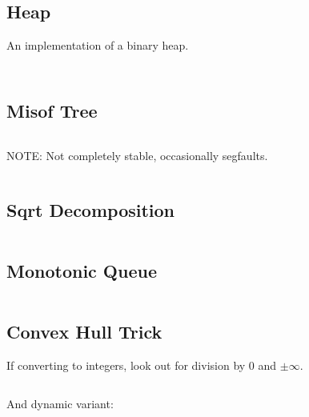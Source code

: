 \documentclass[8pt,a4paper,landscape,oneside]{amsart}
\newcommand{\code}[1]{\inputminted[fontsize=\normalsize,baselinestretch=1]{cpp}{_code/#1}}
\newif\ifverbose
\begin{document}
\begin{multicols*}{3}
    \subsection{Heap}
        An implementation of a binary heap.
        \code{data-structures/heap.cpp}
    \fi

    \ifverbose
    \subsection{Dancing Links}
        \ifverbose
        An implementation of Donald Knuth's Dancing Links data structure. A
        linked list supporting deletion and restoration of elements.
        \fi
        \code{data-structures/dancing_links.cpp}
    \fi

    \subsection{Misof Tree}
        \ifverbose
        A simple tree data structure for inserting, erasing, and querying the
        $n$th largest element.
        \fi
        \code{data-structures/misof_tree.cpp}

    \ifverbose
    \subsection{$k$-d Tree}
        \ifverbose
        A $k$-dimensional tree supporting fast construction, adding points, and
        nearest neighbor queries.
        \fi
        NOTE: Not completely stable, occasionally segfaults.
        \code{data-structures/kd_tree.cpp}
    \fi

    \subsection{Sqrt Decomposition}
        \ifverbose
        Design principle that supports many operations in amortized $\sqrt{n}$ per operation.
        \fi
        \code{data-structures/sqrt_decomposition.cpp}

    \subsection{Monotonic Queue}
        \ifverbose
        A queue that supports querying for the minimum element. Useful for sliding window algorithms.
        \fi
        \code{data-structures/monotonic_queue.cpp}

    \subsection{Convex Hull Trick}
        If converting to integers, look out for division by 0 and $\pm\infty$.
        \code{data-structures/convex_hull_trick.cpp}
        And dynamic variant:
        \code{data-structures/convex_hull_trick_dynamic.cpp}


\end{multicols*}
\end{document}
